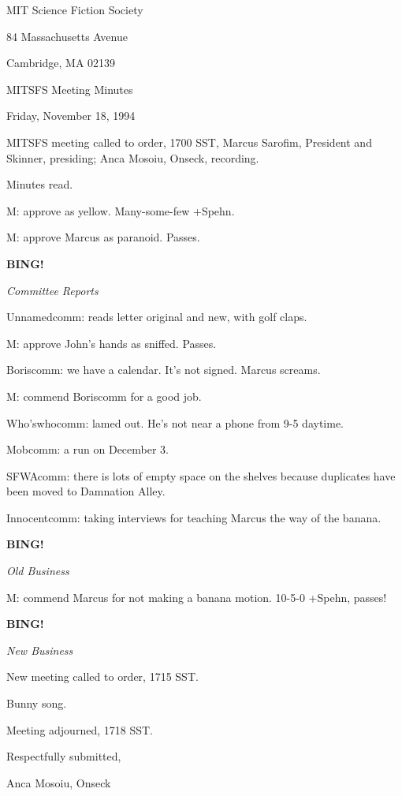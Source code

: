 \documentclass[12pt]{article}
\newcommand{\bing}{{\bf BING!} }
\newcommand{\goto}[1]{\bing \vskip 12pt \centerline{{\em{#1}}}}
\begin{document}
\begin{center}

MIT Science Fiction Society 

84 Massachusetts Avenue

Cambridge, MA 02139

\vspace{12pt}

MITSFS Meeting Minutes 

Friday, November 18, 1994

\end{center}
 
\vspace{18pt}

\setlength{\parskip}{6pt}

\noindent
MITSFS meeting called to order, 1700 SST,
Marcus Sarofim, President and Skinner, presiding; Anca Mosoiu, Onseck, recording.

Minutes read.

M: approve as yellow. Many-some-few +Spehn.

M: approve Marcus as paranoid. Passes.

\goto{Committee Reports}

Unnamedcomm: reads letter original and new, with golf claps.

M: approve John's hands as sniffed. Passes.

Boriscomm: we have a calendar. It's not signed. Marcus screams.

M: commend Boriscomm for a good job.

Who'swhocomm: lamed out. He's not near a phone from 9-5 daytime.

Mobcomm: a run on December 3.

SFWAcomm: there is lots of empty space on the shelves because duplicates have been moved to Damnation Alley.

Innocentcomm: taking interviews for teaching Marcus the way of the banana.

\goto{Old Business}

M: commend Marcus for not making a banana motion. 10-5-0 +Spehn, passes!

\goto{New Business}

New meeting called to order, 1715 SST.

Bunny song.

\vspace{12pt}

\noindent
Meeting adjourned, 1718 SST.

\vspace{18pt}

\centerline{Respectfully submitted,}
\centerline{Anca Mosoiu, Onseck}
\end{document}

